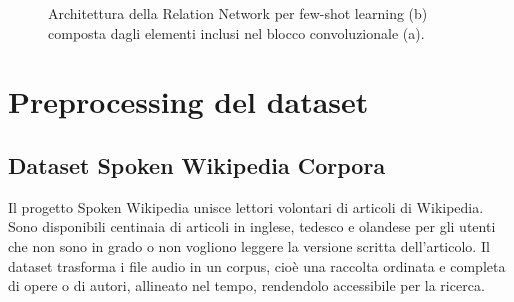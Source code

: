 \documentclass[12pt,a4paper,titlepage]{article}
\begin{document}
\begin{figure}[h]
	\centering
	\qquad
	\label{fig:relation_network_architecture}	
	\caption{Architettura della Relation Network per few-shot learning (b) composta dagli elementi inclusi nel blocco convoluzionale (a).~\cite{DBLP:journals/corr/abs-1711-06025}}
\end{figure}

\clearpage

\section{Preprocessing del dataset}
\label{sec:preprocessing_dataset}
\subsection{Dataset Spoken Wikipedia Corpora}
\label{subsec:spoken_wikipedia_corpora}
Il progetto Spoken Wikipedia unisce lettori volontari di articoli di Wikipedia. Sono disponibili centinaia di articoli in inglese, tedesco e olandese per gli utenti che non sono in grado o non vogliono leggere la versione scritta dell'articolo. Il dataset trasforma i file audio in un corpus, cioè una raccolta ordinata e completa di opere o di autori, allineato nel tempo, rendendolo accessibile per la ricerca.\cite{minining_spoken_wikipedia}
\end{document}
